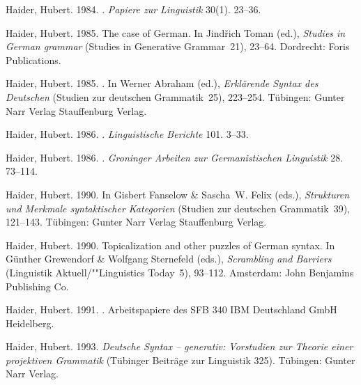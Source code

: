 \begin{thebibliography}{1420}
Haider, Hubert. 1984.
.
\newblock \emph{Papiere zur Linguistik} 30(1). 23--36.

Haider, Hubert. 1985{}.
\newblock The case of {German}.
\newblock In Jind\v{r}ich Toman (ed.), \emph{Studies in {German} grammar}
  (Studies in Generative Grammar~21), 23--64. Dordrecht: Foris Publications.

Haider, Hubert. 1985{}.
.
\newblock In Werner Abraham (ed.), \emph{{Erkl{\"a}rende Syntax des Deutschen}}
  (Studien zur deutschen Grammatik~25), 223--254. T{\"u}bingen: \original
  Gunter Narr Verlag \jetzt Stauffenburg Verlag.

Haider, Hubert. 1986{}.
.
\newblock \emph{Linguistische Berichte} 101. 3--33.

Haider, Hubert. 1986{}.
.
\newblock \emph{Groninger Arbeiten zur Germanistischen Linguistik} 28. 73--114.

Haider, Hubert. 1990{}.
\newblock In Gisbert Fanselow \& Sascha~W. Felix (eds.), \emph{{Strukturen und
  Merkmale syntaktischer Kategorien}} (Studien zur deutschen Grammatik~39),
  121--143. T{\"u}bingen: \original Gunter Narr Verlag \jetzt Stauffenburg
  Verlag.

Haider, Hubert. 1990{}.
\newblock Topicalization and other puzzles of {German} syntax.
\newblock In G{\"u}nther Grewendorf \& Wolfgang Sternefeld (eds.),
  \emph{{Scrambling and Barriers}} (Linguistik Aktuell/""Linguistics Today~5),
  93--112. Amsterdam: John Benjamins Publishing Co.

Haider, Hubert. 1991.
.
\newblock Arbeitspapiere des SFB 340  IBM Deutschland GmbH Heidelberg.

Haider, Hubert. 1993.
\newblock \emph{{Deutsche Syntax -- generativ: Vorstudien zur Theorie einer
  projektiven Grammatik}} (T{\"u}binger Beitr{\"a}ge zur Linguistik 325).
\newblock T{\"u}bingen: Gunter Narr Verlag.


\end{thebibliography}
